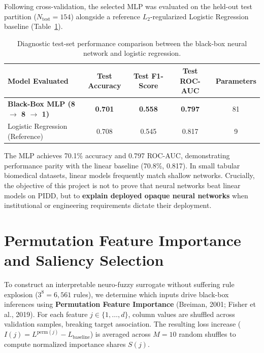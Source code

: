 \documentclass{report}
\begin{document}
Following cross-validation, the selected MLP was evaluated on the held-out test partition ($N_{\text{test}} = 154$) alongside a reference $L_2$-regularized Logistic Regression baseline (Table~\ref{tab:diagnostic_performance}).

\begin{table}[htbp]
\centering
\footnotesize
\renewcommand{\arraystretch}{0.80}
\begin{tabularx}{\textwidth}{>{\raggedright\arraybackslash}X c c c c}
\toprule
\textbf{Model Evaluated} & \textbf{Test Accuracy} & \textbf{Test F1-Score} & \textbf{Test ROC-AUC} & \textbf{Parameters} \\
\midrule
\textbf{Black-Box MLP (8 $\to$ 8 $\to$ 1)} & \textbf{0.701} & \textbf{0.558} & \textbf{0.797} & 81 \\
Logistic Regression (Reference) & 0.708 & 0.545 & 0.817 & 9 \\
\bottomrule
\end{tabularx}
\caption[Diagnostic Test-Set Performance Comparison]{Diagnostic test-set performance comparison between the black-box neural network and logistic regression.}
\label{tab:diagnostic_performance}
\end{table}

The MLP achieves 70.1\% accuracy and 0.797 ROC-AUC, demonstrating performance parity with the linear baseline (70.8\%, 0.817). In small tabular biomedical datasets, linear models frequently match shallow networks. Crucially, the objective of this project is not to prove that neural networks beat linear models on PIDD, but to \textbf{explain deployed opaque neural networks} when institutional or engineering requirements dictate their deployment.

\section{Permutation Feature Importance and Saliency Selection}

To construct an interpretable neuro-fuzzy surrogate without suffering rule explosion ($3^8 = 6{,}561$ rules), we determine which inputs drive black-box inferences using \textbf{Permutation Feature Importance} (Breiman, 2001; Fisher et al., 2019). For each feature $j \in \{1, \dots, d\}$, column values are shuffled across validation samples, breaking target association. The resulting loss increase ($I(j) = L^{\text{perm}(j)} - L_{\text{baseline}}$) is averaged across $M=10$ random shuffles to compute normalized importance shares $S(j)$.
\end{document}
